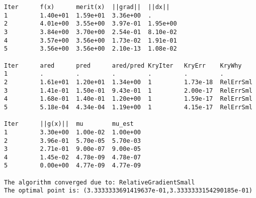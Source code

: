 \begin{lstlisting}[style=peoptOutput,caption={Output generated by PEOpt when running the simple constrained example.  We explain this output in Chapter \ref{ch:Output}.},label=lst:simpleConOut]
Iter      f(x)      merit(x)  ||grad||  ||dx||    
1         1.40e+01  1.59e+01  3.36e+00  .         
2         4.01e+00  3.55e+00  3.97e-01  1.95e+00  
3         3.84e+00  3.70e+00  2.54e-01  8.10e-02  
4         3.57e+00  3.56e+00  1.73e-02  1.91e-01  
5         3.56e+00  3.56e+00  2.10e-13  1.08e-02 
                    
Iter      ared      pred      ared/pred KryIter   KryErr    KryWhy    
1         .         .         .         .         .         .         
2         1.61e+01  1.20e+01  1.34e+00  1         1.73e-18  RelErrSml 
3         1.41e-01  1.50e-01  9.43e-01  1         2.00e-17  RelErrSml 
4         1.68e-01  1.40e-01  1.20e+00  1         1.59e-17  RelErrSml 
5         5.18e-04  4.34e-04  1.19e+00  1         4.15e-17  RelErrSml
                    
Iter      ||g(x)||  mu        mu_est    
1         3.30e+00  1.00e-02  1.00e+00  
2         3.96e-01  5.70e-05  5.70e-03  
3         2.71e-01  9.00e-07  9.00e-05  
4         1.45e-02  4.78e-09  4.78e-07  
5         0.00e+00  4.77e-09  4.77e-09  

The algorithm converged due to: RelativeGradientSmall
The optimal point is: (3.3333333691419637e-01,3.3333333154290185e-01)
\end{lstlisting}
